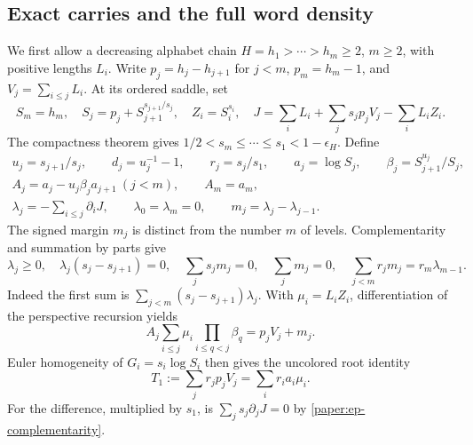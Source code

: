 \subsection{Exact carries and the full word density}
\label{paper:ep-carries}\label{proof:A02}

We first allow a decreasing alphabet chain
$H=h_1>\cdots>h_m\ge2$, $m\ge2$, with positive lengths $L_i$.
Write $p_j=h_j-h_{j+1}$ for $j<m$, $p_m=h_m-1$, and
$V_j=\sum_{i\le j}L_i$. At its ordered saddle, set
\[
 S_m=h_m,\quad S_j=p_j+S_{j+1}^{s_{j+1}/s_j},\quad
 Z_i=S_i^{s_i},\quad
 J=\sum_iL_i+\sum_js_jp_jV_j-\sum_iL_iZ_i.
\]
The compactness theorem gives
$1/2<s_m\le\cdots\le s_1<1-\epsilon_H$. Define
\begin{gather*}
 u_j=s_{j+1}/s_j,\qquad d_j=u_j^{-1}-1,\qquad
 r_j=s_j/s_1,\qquad a_j=\log S_j,\qquad
 \beta_j=S_{j+1}^{u_j}/S_j,\\
 A_j=a_j-u_j\beta_ja_{j+1}\ (j<m),\qquad A_m=a_m,\\
 \lambda_j=-\sum_{i\le j}\partial_iJ,\qquad
 \lambda_0=\lambda_m=0,\qquad m_j=\lambda_j-\lambda_{j-1}.
\end{gather*}
The signed margin $m_j$ is distinct from the number $m$ of levels.
Complementarity and summation by parts give
\begin{equation}
 \lambda_j\ge0,\quad\lambda_j(s_j-s_{j+1})=0,\quad
 \sum_js_jm_j=0,\quad\sum_jm_j=0,\quad
 \sum_{j<m}r_jm_j=r_m\lambda_{m-1}.
 \label{paper:ep-complementarity}
\end{equation}
Indeed the first sum is
$\sum_{j<m}(s_j-s_{j+1})\lambda_j$.
With $\mu_i=L_iZ_i$, differentiation of the perspective recursion yields
\begin{equation}
 A_j\sum_{i\le j}\mu_i\prod_{i\le q<j}\beta_q=p_jV_j+m_j.
 \label{paper:ep-stationarity}
\end{equation}
Euler homogeneity of $G_i=s_i\log S_i$ then gives the uncolored root identity
\begin{equation}
 T_1:=\sum_jr_jp_jV_j=\sum_ir_ia_i\mu_i.
 \label{paper:ep-euler}
\end{equation}
For the difference, multiplied by $s_1$, is
$\sum_js_j\partial_jJ=0$ by \eqref{paper:ep-complementarity}.

